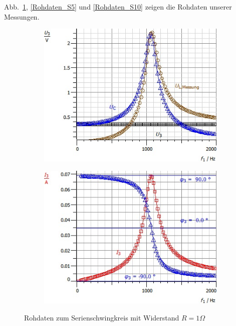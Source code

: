 \documentclass[12pt,a4paper]{article}
\begin{document}
Abb.~\ref{Rohdaten_S1}, \ref{Rohdaten_S5} und \ref{Rohdaten_S10} zeigen die Rohdaten unserer Messungen.
\begin{figure}[H]
	\centering
	\begin{subfigure}{0.49\textwidth}
		\centering
		\includegraphics[width=\textwidth]{Daten/S1Ohm_Rohdaten_U.jpg}
	\end{subfigure}
	\begin{subfigure}{0.49\textwidth}
		\centering
		\includegraphics[width=\textwidth]{Daten/S1Ohm_Rohdaten_I.jpg}
	\end{subfigure}
	\caption{Rohdaten zum Serienschwingkreis mit Widerstand $R=1\Omega$}
	\label{Rohdaten_S1}
\end{figure}
\end{document}
